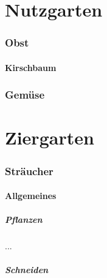 \documentclass[]{article}
\title{}
\author{}
\begin{document}
\maketitle

\begin{abstract}

\end{abstract}

\part{Nutzgarten}

\pagebreak

\section{Obst}

\subsection{Kirschbaum}

\section{Gemüse}

\pagebreak

\part{Ziergarten}

\pagebreak

\section{Sträucher}

\subsection{Allgemeines}

\subsubsection{Pflanzen}

...

\subsubsection{Schneiden}
\end{document}
